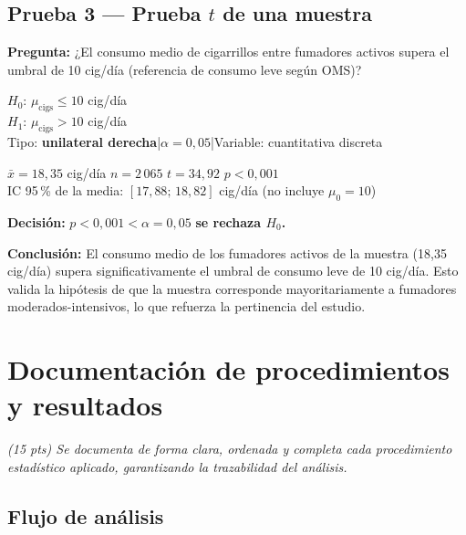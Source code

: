 \documentclass[11pt,a4paper]{article}
\newcommand{\guia}[1]{{\small\itshape\color{gris}#1}\par\vspace{0.15em}}
\begin{document}
\subsection{Prueba 3 — Prueba $t$ de una muestra}

\textbf{Pregunta:} ¿El consumo medio de cigarrillos entre fumadores activos supera
el umbral de 10 cig/día (referencia de consumo leve según OMS)?

\begin{hipbox}
$H_0$: $\mu_{\text{cigs}} \leq 10$ cig/día\\
$H_1$: $\mu_{\text{cigs}} > 10$ cig/día\\
Tipo: \textbf{unilateral derecha}\quad|\quad$\alpha = 0{,}05$\quad|\quad Variable: cuantitativa discreta

\vspace{0.4em}
$\bar{x} = 18{,}35$ cig/día \quad $n = 2\,065$ \quad
$t = 34{,}92$ \quad $p < 0{,}001$\\
IC 95\,\% de la media: $[17{,}88;\, 18{,}82]$ cig/día (no incluye $\mu_0 = 10$)

\vspace{0.4em}
\textbf{Decisión:} $p < 0{,}001 < \alpha = 0{,}05$ \;\textrightarrow\; \textbf{se rechaza $H_0$.}

\textbf{Conclusión:} El consumo medio de los fumadores activos de la muestra
(18{,}35 cig/día) supera significativamente el umbral de consumo leve de 10 cig/día.
Esto valida la hipótesis de que la muestra corresponde mayoritariamente a fumadores
moderados-intensivos, lo que refuerza la pertinencia del estudio.
\end{hipbox}

\section{Documentación de procedimientos y resultados}
\label{sec:documentacion}

\guia{(15 pts) Se documenta de forma clara, ordenada y completa cada procedimiento
estadístico aplicado, garantizando la trazabilidad del análisis.}

\subsection{Flujo de análisis}
\end{document}
